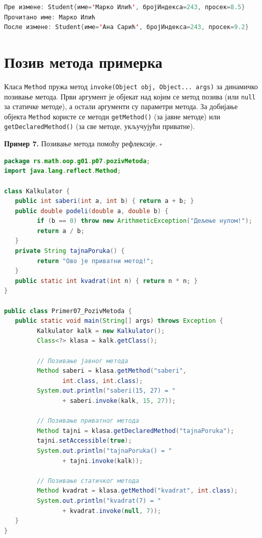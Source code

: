 \begin{lstlisting}[language=Java]
Пре измене: Student{име='Марко Илић', бројИндекса=243, просек=8.5}
Прочитано име: Марко Илић
После измене: Student{име='Ана Сарић', бројИндекса=243, просек=9.2}
\end{lstlisting}

\section{Позив метода примерка}

Класа \texttt{Method} пружа метод \texttt{invoke(Object obj, Object... args)} за динамичко позивање метода. Први аргумент је објекат над којим се метод позива (или \texttt{null} за статичке методе), а остали аргументи су параметри метода. За добијање објекта \texttt{Method} користе се методи \texttt{getMethod()} (за јавне методе) или \texttt{getDeclaredMethod()} (за све методе, укључујући приватне).


\bigskip

\noindent \textbf{Пример 7.} Позивање метода помоћу рефлексије. $\square$

\medskip

\begin{lstlisting}[language=Java]
package rs.math.oop.g01.p07.pozivMetoda;
import java.lang.reflect.Method;
 
class Kalkulator {
   public int saberi(int a, int b) { return a + b; }
   public double podeli(double a, double b) {
         if (b == 0) throw new ArithmeticException("Дељење нулом!");
         return a / b;
   }
   private String tajnaPoruka() {
         return "Ово је приватни метод!";
   }
   public static int kvadrat(int n) { return n * n; }
}
 
public class Primer07_PozivMetoda {
   public static void main(String[] args) throws Exception {
         Kalkulator kalk = new Kalkulator();
         Class<?> klasa = kalk.getClass();
 
         // Позивање јавног метода
         Method saberi = klasa.getMethod("saberi",
                int.class, int.class);
         System.out.println("saberi(15, 27) = "
                + saberi.invoke(kalk, 15, 27));
 
         // Позивање приватног метода
         Method tajni = klasa.getDeclaredMethod("tajnaPoruka");
         tajni.setAccessible(true);
         System.out.println("tajnaPoruka() = "
                + tajni.invoke(kalk));
 
         // Позивање статичког метода
         Method kvadrat = klasa.getMethod("kvadrat", int.class);
         System.out.println("kvadrat(7) = "
                + kvadrat.invoke(null, 7));
   }
}
\end{lstlisting}


